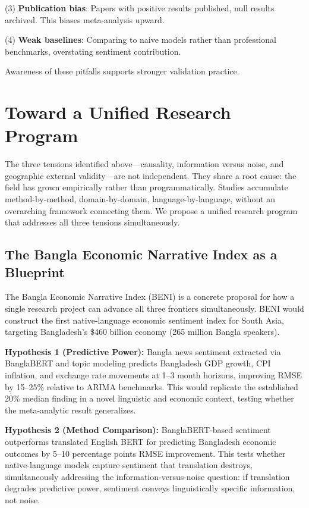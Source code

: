 \documentclass[11pt]{article}
\begin{document}
\noindent
(3) \textbf{Publication bias}: Papers with positive results published, null results archived. This biases meta-analysis upward.

\noindent
(4) \textbf{Weak baselines}: Comparing to naive models rather than professional benchmarks, overstating sentiment contribution.

Awareness of these pitfalls supports stronger validation practice.

\section{Toward a Unified Research Program}

The three tensions identified above---causality, information versus noise, and geographic external validity---are not independent. They share a root cause: the field has grown empirically rather than programmatically. Studies accumulate method-by-method, domain-by-domain, language-by-language, without an overarching framework connecting them. We propose a unified research program that addresses all three tensions simultaneously.

\subsection{The Bangla Economic Narrative Index as a Blueprint}

The Bangla Economic Narrative Index (BENI) is a concrete proposal for how a single research project can advance all three frontiers simultaneously. BENI would construct the first native-language economic sentiment index for South Asia, targeting Bangladesh's \$460 billion economy (265 million Bangla speakers).

\hspace*{0.5em}\textbf{Hypothesis 1 (Predictive Power):} Bangla news sentiment extracted via BanglaBERT and topic modeling predicts Bangladesh GDP growth, CPI inflation, and exchange rate movements at 1--3 month horizons, improving RMSE by 15--25\% relative to ARIMA benchmarks. This would replicate the established 20\% median finding in a novel linguistic and economic context, testing whether the meta-analytic result generalizes.

\hspace*{0.5em}\textbf{Hypothesis 2 (Method Comparison):} BanglaBERT-based sentiment outperforms translated English BERT for predicting Bangladesh economic outcomes by 5--10 percentage points RMSE improvement. This tests whether native-language models capture sentiment that translation destroys, simultaneously addressing the information-versus-noise question: if translation degrades predictive power, sentiment conveys linguistically specific information, not noise.
\end{document}
